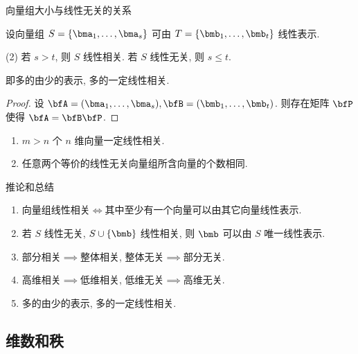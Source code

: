 \begin{frame}{向量组大小与线性无关的关系}
	\onslide<+->
	\begin{theorem}
		设向量组 $S=\{\bma_1,\dots,\bma_s\}$ 可由 $T=\{\bmb_1,\dots,\bmb_t\}$ 线性表示.
		\begin{tasks}(2)
			\task 若 $s>t$, 则 $S$ 线性相关.
			\task 若 $S$ 线性无关, 则 $s\le t$.
		\end{tasks}
	\end{theorem}
	\onslide<+->
	即\alert{多的由少的表示, 多的一定线性相关}.
	\onslide<+->
	\begin{proof}
		设 $\bfA=(\bma_1,\dots,\bma_s),\bfB=(\bmb_1,\dots,\bmb_t)$.
		则存在矩阵 $\bfP$ 使得 $\bfA=\bfB\bfP$.
		\onslide<+->{%
		从而 $\bfA\bfx=\bfB\bfP\bfx={\bf0}$, $S$ 线性相关.\qedhere
		}
	\end{proof}
	\onslide<+->
	\begin{corollary}
		\begin{enumerate}
			\item $m>n$ 个 $n$ 维向量一定线性相关.
			\item 任意两个\alert{等价的线性无关}向量组所含向量的个数相同.
		\end{enumerate}
	\end{corollary}
\end{frame}


\begin{frame}{推论和总结}
	\begin{enumerate}
		\item 向量组线性相关$\iff$其中至少有一个向量可以由其它向量线性表示.
		\item 若 $S$ 线性无关, $S\cup\{\bmb\}$ 线性相关, 则 $\bmb$ 可以由 $S$ 唯一线性表示.
		\item 部分相关$\implies$整体相关, 整体无关$\implies$部分无关.
		\item 高维相关$\implies$低维相关, 低维无关$\implies$高维无关.
		\item 多的由少的表示, 多的一定线性相关.
	\end{enumerate}
\end{frame}



\subsection{维数和秩}


